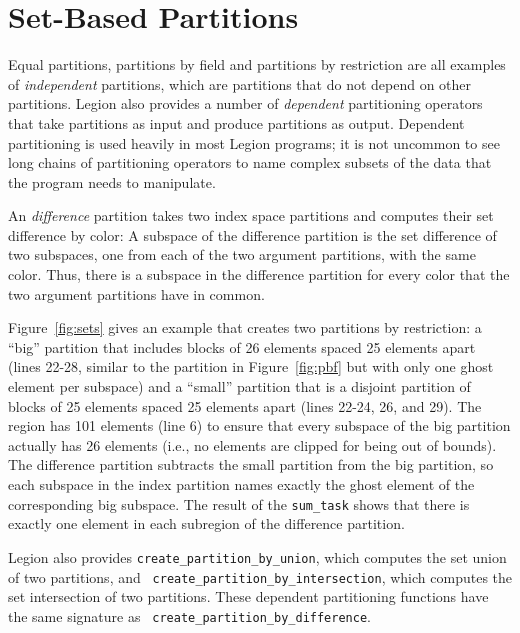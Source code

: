 \begin{figure}
  
  \caption{}
  \label{fig:pbr}
\end{figure}


\section{Set-Based Partitions}
\label{sec:set}

Equal partitions, partitions by field and partitions by restriction are all examples of {\em independent} partitions, which are partitions that do
not depend on other partitions.  Legion also provides a number of {\em dependent} partitioning operators that take partitions as input and
produce partitions as output.  Dependent partitioning is used heavily in most Legion programs; it is not uncommon to see long chains of
partitioning operators to name complex subsets of the data that the program needs to manipulate. 

An {\em difference} partition takes two index space partitions and computes their set difference by color: A subspace of the difference partition
is the set difference of two subspaces, one from each of the two argument partitions, with the same color.  Thus, there is a subspace in the difference
partition for every color that the two argument partitions have in common.

Figure~\ref{fig:sets} gives an example that creates two partitions by restriction: a ``big'' partition that includes blocks of 26 elements spaced 25 elements apart (lines 22-28, similar to  the partition in Figure~\ref{fig:pbf} but with only one ghost element per subspace) and a ``small'' partition that is a disjoint partition of blocks of 25 elements spaced 25 elements apart (lines 22-24, 26, and 29). The region has 101 elements (line 6) to ensure that every subspace of the big partition actually has 26 elements (i.e., no elements are clipped for being out of bounds).  The difference partition subtracts the small partition from the big partition, so each subspace in the index partition names exactly the ghost element of the corresponding big subspace.  The result of the {\tt sum\_task} shows that there is exactly one element in each subregion of the difference partition.

Legion also provides {\tt create\_partition\_by\_union}, which
computes the set union of two partitions, and {\tt
  create\_partition\_by\_intersection}, which computes the set intersection
of two partitions.  These dependent
partitioning functions have the same signature as {\tt
  create\_partition\_by\_difference}.


